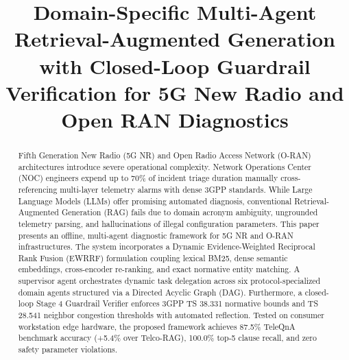 \documentclass[conference]{IEEEtran}
\begin{document}
\title{Domain-Specific Multi-Agent Retrieval-Augmented Generation with Closed-Loop Guardrail Verification for 5G New Radio and Open RAN Diagnostics}

\author{
\and
{}
\and
{}
}

\maketitle

\begin{abstract}
Fifth Generation New Radio (5G NR) and Open Radio Access Network (O-RAN) architectures introduce severe operational complexity. Network Operations Center (NOC) engineers expend up to 70\% of incident triage duration manually cross-referencing multi-layer telemetry alarms with dense 3GPP standards. While Large Language Models (LLMs) offer promising automated diagnosis, conventional Retrieval-Augmented Generation (RAG) fails due to domain acronym ambiguity, ungrounded telemetry parsing, and hallucinations of illegal configuration parameters. This paper presents an offline, multi-agent diagnostic framework for 5G NR and O-RAN infrastructures. The system incorporates a Dynamic Evidence-Weighted Reciprocal Rank Fusion (EWRRF) formulation coupling lexical BM25, dense semantic embeddings, cross-encoder re-ranking, and exact normative entity matching. A supervisor agent orchestrates dynamic task delegation across six protocol-specialized domain agents structured via a Directed Acyclic Graph (DAG). Furthermore, a closed-loop Stage 4 Guardrail Verifier enforces 3GPP TS 38.331 normative bounds and TS 28.541 neighbor congestion thresholds with automated reflection. Tested on consumer workstation edge hardware, the proposed framework achieves 87.5\% TeleQnA benchmark accuracy (+5.4\% over Telco-RAG), 100.0\% top-5 clause recall, and zero safety parameter violations.
\end{abstract}
\end{document}
